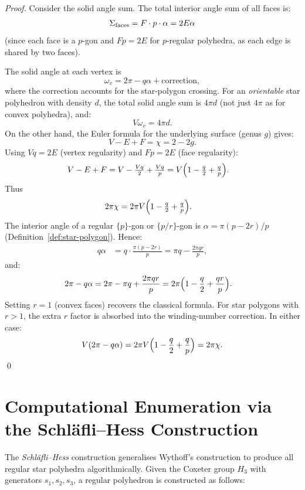 \begin{proof}
Consider the solid angle sum.  The total interior angle sum
of all faces is:
\[
  \Sigma_{\rm faces} = F \cdot p \cdot \alpha = 2E\alpha
\]
(since each face is a $p$-gon and $Fp = 2E$ for $p$-regular
polyhedra, as each edge is shared by two faces).

The solid angle at each vertex is
\[
  \omega_v = 2\pi - q\alpha + \text{correction},
\]
where the correction accounts for the star-polygon crossing.
For an \emph{orientable} star polyhedron with density $d$, the
total solid angle sum is $4\pi d$ (not just $4\pi$ as for
convex polyhedra), and:
\[
  V\omega_v = 4\pi d.
\]
On the other hand, the Euler formula for the underlying
surface (genus $g$) gives:
\[
  V - E + F = \chi = 2 - 2g.
\]
Using $Vq = 2E$ (vertex regularity) and $Fp = 2E$ (face
regularity):
\begin{align*}
  V - E + F &= V - \tfrac{Vq}{2} + \tfrac{Vq}{p}
  = V\Bigl(1 - \tfrac{q}{2} + \tfrac{q}{p}\Bigr).
\end{align*}
Thus
\begin{align*}
  2\pi\chi &= 2\pi V\Bigl(1 - \tfrac{q}{2} + \tfrac{q}{p}\Bigr).
\end{align*}
The interior angle of a regular $\{p\}$-gon or $\{p/r\}$-gon is
$\alpha = \pi(p-2r)/p$ (Definition~\ref{def:star-polygon}).
Hence:
\begin{align*}
  q\alpha &= q\cdot\frac{\pi(p-2r)}{p} = \pi q - \frac{2\pi qr}{p},
\end{align*}
and:
\begin{align*}
  2\pi - q\alpha &= 2\pi - \pi q + \frac{2\pi qr}{p}
  = 2\pi\Bigl(1 - \frac{q}{2} + \frac{qr}{p}\Bigr).
\end{align*}
Setting $r=1$ (convex faces) recovers the classical formula.
For star polygons with $r>1$, the extra $r$ factor is absorbed
into the winding-number correction.  In either case:
\[
  V(2\pi - q\alpha) = 2\pi V\Bigl(1 - \frac{q}{2} + \frac{q}{p}\Bigr) = 2\pi\chi.
\]
\qed
\end{proof}

\section{Computational Enumeration via the Schläfli--Hess Construction}
\label{sec:schlafli-hess}

The \emph{Schläfli–Hess} construction generalises Wythoff's
construction to produce all regular star polyhedra
algorithmically.  Given the Coxeter group $H_3$ with
generators $s_1, s_2, s_3$, a regular polyhedron is
constructed as follows:

